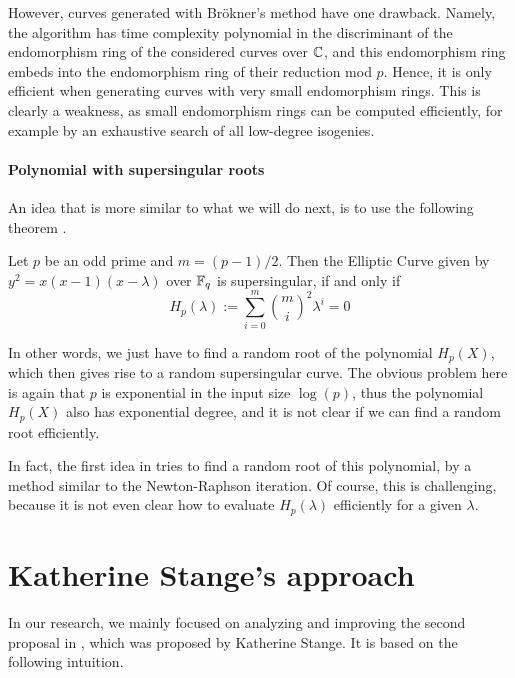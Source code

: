 However, curves generated with Brökner's method have one drawback.
Namely, the algorithm has time complexity polynomial in the discriminant of the endomorphism ring of the considered curves over $\mathbb{C}$, and this endomorphism ring embeds into the endomorphism ring of their reduction mod $p$.
Hence, it is only efficient when generating curves with very small endomorphism rings.
This is clearly a weakness, as small endomorphism rings can be computed efficiently, for example by an exhaustive search of all low-degree isogenies.

\paragraph{Polynomial with supersingular roots} An idea that is more similar to what we will do next, is to use the following theorem \cite[Thm~V.4.1]{arithmetic_elliptic_curves}.
\begin{theorem}
    Let $p$ be an odd prime and $m = (p - 1)/2$. Then the Elliptic Curve given by $y^2 = x(x - 1)(x - \lambda)$ over $\mathbb{F}_q$ is supersingular, if and only if
    \begin{equation*}
        H_p(\lambda) := \sum_{i = 0}^m {m \choose i}^2 \lambda^i = 0
    \end{equation*}
\end{theorem}
In other words, we just have to find a random root of the polynomial $H_p(X)$, which then gives rise to a random supersingular curve.
The obvious problem here is again that $p$ is exponential in the input size $\log(p)$, thus the polynomial $H_p(X)$ also has exponential degree, and it is not clear if we can find a random root efficiently.

In fact, the first idea in \cite{base_paper} tries to find a random root of this polynomial, by a method similar to the Newton-Raphson iteration.
Of course, this is challenging, because it is not even clear how to evaluate $H_p(\lambda)$ efficiently for a given $\lambda$.

\section{Katherine Stange's approach}
In our research, we mainly focused on analyzing and improving the second proposal in \cite{base_paper}, which was proposed by Katherine Stange.
It is based on the following intuition.

